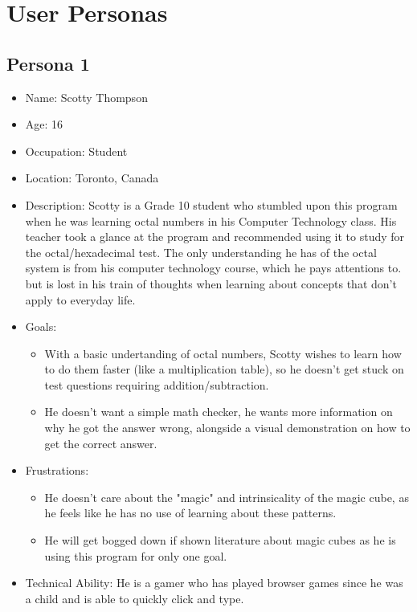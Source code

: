 \documentclass[12pt]{article}
\begin{document}
\section{User Personas}


\subsection{Persona 1}
\begin{itemize}
\item Name: Scotty Thompson
\item Age: 16
\item Occupation: Student
\item Location: Toronto, Canada
\item Description: Scotty is a Grade 10 student who stumbled upon this program when he was learning octal numbers in his Computer Technology class. His teacher took a glance at the program and recommended using it to study for the octal/hexadecimal test. The only understanding he has of the octal system is from his computer technology course, which he pays attentions to. but is lost in his train of thoughts when learning about concepts that don't apply to everyday life.
\item Goals: 
\begin{itemize}
  \item With a basic undertanding of octal numbers, Scotty wishes to learn how to do them faster (like a multiplication table), so he doesn't get stuck on test questions requiring addition/subtraction.
  \item He doesn't want a simple math checker, he wants more information on why he got the answer wrong, alongside a visual demonstration on how to get the correct answer.
\end{itemize}
\item Frustrations:
\begin{itemize}
  \item He doesn't care about the "magic" and intrinsicality of the magic cube, as he feels like he has no use of learning about these patterns.
  \item He will get bogged down if shown literature about magic cubes as he is using this program for only one goal.
\end{itemize}
\item Technical Ability: He is a gamer who has played browser games since he was a child and is able to quickly click and type.
\end{itemize}
\end{document}
